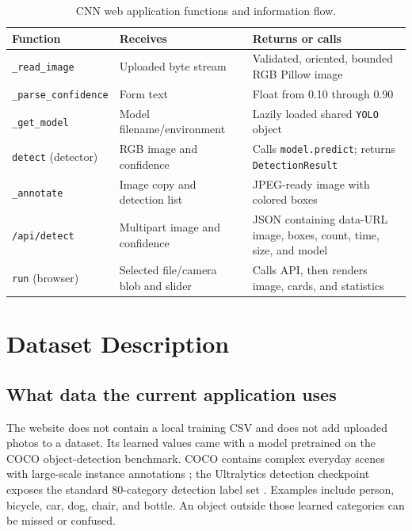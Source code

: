 \documentclass[12pt,a4paper,openany]{report}
\begin{document}
\begin{table}[H]
\centering
\caption{CNN web application functions and information flow.}
\begin{tabularx}{\textwidth}{p{}YY}
\toprule
\textbf{Function} & \textbf{Receives} & \textbf{Returns or calls} \\
\midrule
\texttt{\_read\_image} & Uploaded byte stream & Validated, oriented, bounded RGB Pillow image \\
\texttt{\_parse\_confidence} & Form text & Float from 0.10 through 0.90 \\
\texttt{\_get\_model} & Model filename/environment & Lazily loaded shared \texttt{YOLO} object \\
\texttt{detect} (detector) & RGB image and confidence & Calls \texttt{model.predict}; returns \texttt{DetectionResult} \\
\texttt{\_annotate} & Image copy and detection list & JPEG-ready image with colored boxes \\
\texttt{/api/detect} & Multipart image and confidence & JSON containing data-URL image, boxes, count, time, size, and model \\
\texttt{run} (browser) & Selected file/camera blob and slider & Calls API, then renders image, cards, and statistics \\
\bottomrule
\end{tabularx}
\end{table}

\section{Dataset Description}
\subsection{What data the current application uses}
The website does not contain a local training CSV and does not add uploaded
photos to a dataset. Its learned values came with a model pretrained on the
COCO object-detection benchmark. COCO contains complex everyday scenes with
large-scale instance annotations \cite{coco}; the Ultralytics detection
checkpoint exposes the standard 80-category detection label set
\cite{ultralyticsV8}. Examples include person, bicycle, car, dog, chair, and
bottle. An object outside those learned categories can be missed or confused.
\end{document}
